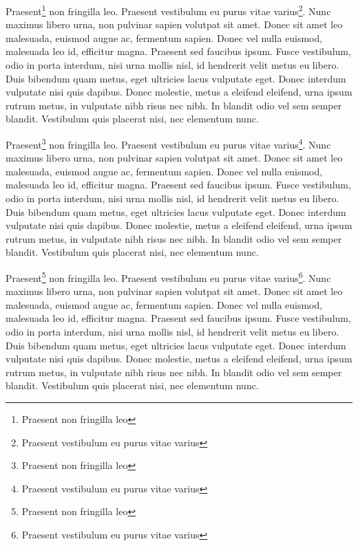 \documentclass[
]{book}
\newenvironment{env-8f08c627-1fa3-4d4d-933c-e8c841c72ea1}
{
    \savenotes\tcolorbox[blanker,if odd page={left=5pt,borderline west={4pt}{-4pt}{firebrick}}{right=5pt,borderline east={4pt}{-4pt}{firebrick}}]
}
{
    \endtcolorbox\spewnotes
}
\begin{document}
\begin{env-8f08c627-1fa3-4d4d-933c-e8c841c72ea1}

Praesent\footnote{Praesent non fringilla leo} non fringilla leo.
Praesent vestibulum eu purus vitae varius\footnote{Praesent vestibulum
  eu purus vitae varius}. Nunc maximus libero urna, non pulvinar sapien
volutpat sit amet. Donec sit amet leo malesuada, euismod augue ac,
fermentum sapien. Donec vel nulla euismod, malesuada leo id, efficitur
magna. Praesent sed faucibus ipsum. Fusce vestibulum, odio in porta
interdum, nisi urna mollis nisl, id hendrerit velit metus eu libero.
Duis bibendum quam metus, eget ultricies lacus vulputate eget. Donec
interdum vulputate nisi quis dapibus. Donec molestie, metus a eleifend
eleifend, urna ipsum rutrum metus, in vulputate nibh risus nec nibh. In
blandit odio vel sem semper blandit. Vestibulum quis placerat nisi, nec
elementum nunc.

\end{env-8f08c627-1fa3-4d4d-933c-e8c841c72ea1}

\begin{env-8f08c627-1fa3-4d4d-933c-e8c841c72ea1}

Praesent\footnote{Praesent non fringilla leo} non fringilla leo.
Praesent vestibulum eu purus vitae varius\footnote{Praesent vestibulum
  eu purus vitae varius}. Nunc maximus libero urna, non pulvinar sapien
volutpat sit amet. Donec sit amet leo malesuada, euismod augue ac,
fermentum sapien. Donec vel nulla euismod, malesuada leo id, efficitur
magna. Praesent sed faucibus ipsum. Fusce vestibulum, odio in porta
interdum, nisi urna mollis nisl, id hendrerit velit metus eu libero.
Duis bibendum quam metus, eget ultricies lacus vulputate eget. Donec
interdum vulputate nisi quis dapibus. Donec molestie, metus a eleifend
eleifend, urna ipsum rutrum metus, in vulputate nibh risus nec nibh. In
blandit odio vel sem semper blandit. Vestibulum quis placerat nisi, nec
elementum nunc.

\end{env-8f08c627-1fa3-4d4d-933c-e8c841c72ea1}

\begin{env-8f08c627-1fa3-4d4d-933c-e8c841c72ea1}

Praesent\footnote{Praesent non fringilla leo} non fringilla leo.
Praesent vestibulum eu purus vitae varius\footnote{Praesent vestibulum
  eu purus vitae varius}. Nunc maximus libero urna, non pulvinar sapien
volutpat sit amet. Donec sit amet leo malesuada, euismod augue ac,
fermentum sapien. Donec vel nulla euismod, malesuada leo id, efficitur
magna. Praesent sed faucibus ipsum. Fusce vestibulum, odio in porta
interdum, nisi urna mollis nisl, id hendrerit velit metus eu libero.
Duis bibendum quam metus, eget ultricies lacus vulputate eget. Donec
interdum vulputate nisi quis dapibus. Donec molestie, metus a eleifend
eleifend, urna ipsum rutrum metus, in vulputate nibh risus nec nibh. In
blandit odio vel sem semper blandit. Vestibulum quis placerat nisi, nec
elementum nunc.

\end{env-8f08c627-1fa3-4d4d-933c-e8c841c72ea1}
\end{document}
